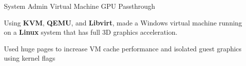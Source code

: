 


\begin{cventries}


\cventry
{System Admin} %
{Virtual Machine GPU Passthrough } %
{}%
{}%
{ %
  \begin{cvitems}
  \item{Using \textbf{KVM}, \textbf{QEMU}, and \textbf{Libvirt}, made   a Windows virtual machine running on a \textbf{Linux} system that has full 3D graphics acceleration.}
  \item{Used huge pages to increase VM cache performance and isolated guest graphics using kernel flags}
  \end{cvitems}
}


\end{cventries}
